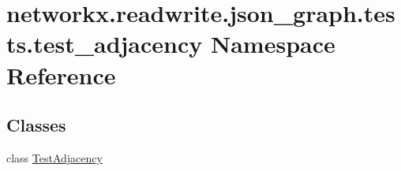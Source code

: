 \hypertarget{namespacenetworkx_1_1readwrite_1_1json__graph_1_1tests_1_1test__adjacency}{}\section{networkx.\+readwrite.\+json\+\_\+graph.\+tests.\+test\+\_\+adjacency Namespace Reference}
\label{namespacenetworkx_1_1readwrite_1_1json__graph_1_1tests_1_1test__adjacency}
\subsection*{Classes}
\begin{DoxyCompactItemize}
\item 
class \hyperlink{classnetworkx_1_1readwrite_1_1json__graph_1_1tests_1_1test__adjacency_1_1TestAdjacency}{Test\+Adjacency}
\end{DoxyCompactItemize}
